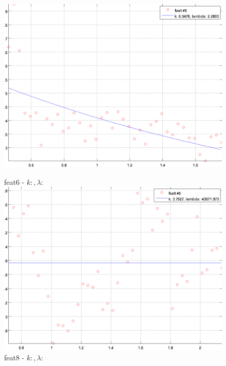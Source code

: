 \documentclass[12pt]{report}
\begin{document}
\begin{figure}[H]
\begin{minipage}[t]{0.5\linewidth}
	\includegraphics[scale=\imFeat]{images/feat9}\\
\end{minipage}
\begin{minipage}[t]{0.5\linewidth}
	\centering
	feat6 - $k: , \lambda:  $\\
	\includegraphics[scale=\imFeat]{images/feat6}\\
	feat8 - $k: , \lambda:  $\\

\end{minipage}
\end{figure}
\end{document}
